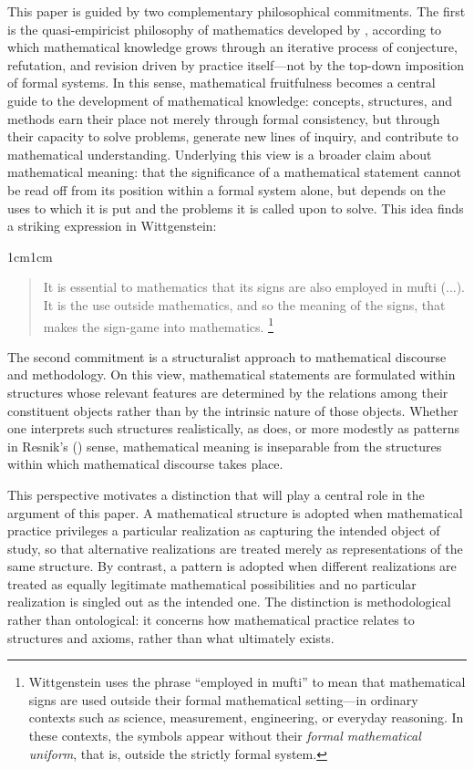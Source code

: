 \documentclass[11pt,a4paper]{book}
\theoremstyle{plain}
\begin{document}
This paper is guided by two complementary philosophical commitments. The first is the quasi-empiricist philosophy of mathematics developed by \textcite{Lakatos1976}, according to which mathematical knowledge grows through an iterative process of conjecture, refutation, and revision driven by practice itself—not by the top-down imposition of formal systems. In this sense, mathematical fruitfulness becomes a central guide to the development of mathematical knowledge: concepts, structures, and methods earn their place not merely through formal consistency, but through their capacity to solve problems, generate new lines of inquiry, and contribute to mathematical understanding. Underlying this view is a broader claim about mathematical meaning: that the significance of a mathematical statement cannot be read off from its position within a formal system alone, but depends on the uses to which it is put and the problems it is called upon to solve. This idea finds a striking expression in Wittgenstein:

\begin{adjustwidth}{1cm}{1cm}
\small
\begin{quote}
It is essential to mathematics that its signs are also employed in mufti (...). It is the use outside mathematics, and so the meaning of the signs, that makes the sign-game into mathematics. \parencite[V §2]{Wittgenstein1978}\footnote{Wittgenstein uses the phrase “employed in mufti” to mean that mathematical signs are used outside their formal mathematical setting—in ordinary contexts such as science, measurement, engineering, or everyday reasoning. In these contexts, the symbols appear without their \textit{formal mathematical uniform}, that is, outside the strictly formal system.}
\end{quote}
\end{adjustwidth}

The second commitment is a structuralist approach to mathematical discourse and methodology. On this view, mathematical statements are formulated within structures whose relevant features are determined by the relations among their constituent objects rather than by the intrinsic nature of those objects. Whether one interprets such structures realistically, as \textcite{Shapiro1997} does, or more modestly as patterns in Resnik's (\citeyear{Resnik1981}) sense, mathematical meaning is inseparable from the structures within which mathematical discourse takes place.

This perspective motivates a distinction that will play a central role in the argument of this paper. A mathematical structure is adopted when mathematical practice privileges a particular realization as capturing the intended object of study, so that alternative realizations are treated merely as representations of the same structure. By contrast, a pattern is adopted when different realizations are treated as equally legitimate mathematical possibilities and no particular realization is singled out as the intended one. The distinction is methodological rather than ontological: it concerns how mathematical practice relates to structures and axioms, rather than what ultimately exists.
\end{document}
